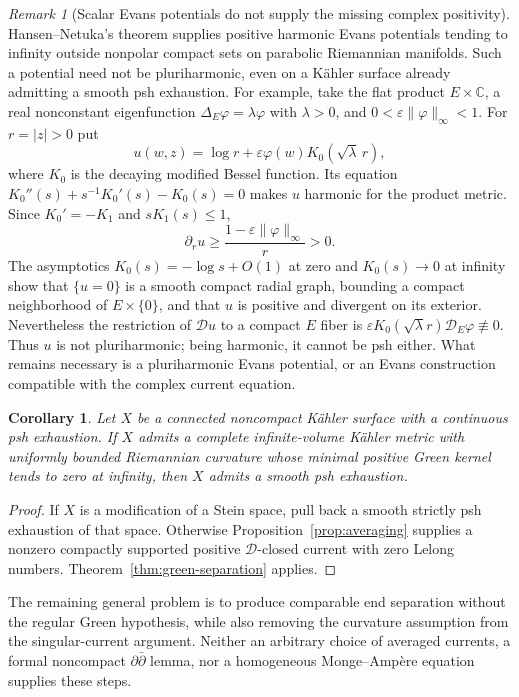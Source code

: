 \documentclass[11pt]{article}
\newtheorem{corollary}[theorem]{Corollary}
\theoremstyle{remark}
\newtheorem{remark}[theorem]{Remark}
\newcommand{\D}{\mathcal D}
\begin{document}
\begin{remark}[Scalar Evans potentials do not supply the missing complex positivity]
Hansen--Netuka's theorem \cite{HN} supplies positive harmonic Evans
potentials tending to infinity outside nonpolar compact sets on
parabolic Riemannian manifolds. Such a potential need not be
pluriharmonic, even on a K\"ahler surface already admitting a smooth
psh exhaustion. For example, take the flat product $E\times\mathbb C$,
a real nonconstant eigenfunction $\Delta_E\varphi=\lambda\varphi$
with $\lambda>0$, and $0<\varepsilon\|\varphi\|_\infty<1$.
For $r=|z|>0$ put
\[
 u(w,z)=\log r+\varepsilon\varphi(w)K_0(\sqrt\lambda\,r),
\]
where $K_0$ is the decaying modified Bessel function. Its equation
$K_0''(s)+s^{-1}K_0'(s)-K_0(s)=0$ makes $u$ harmonic for the product
metric. Since $K_0'=-K_1$ and $sK_1(s)\le1$,
\[
 \partial_r u\ge \frac{1-\varepsilon\|\varphi\|_\infty}{r}>0.
\]
The asymptotics $K_0(s)=-\log s+O(1)$ at zero and $K_0(s)\to0$ at
infinity show that $\{u=0\}$ is a smooth compact radial graph, bounding
a compact neighborhood of $E\times\{0\}$, and that $u$ is positive and
divergent on its exterior. Nevertheless the restriction of $\D u$
to a compact $E$ fiber is
$\varepsilon K_0(\sqrt\lambda r)\D_E\varphi\not\equiv0$.
Thus $u$ is not pluriharmonic; being harmonic, it cannot be psh either.
What remains necessary is a pluriharmonic Evans potential, or an Evans
construction compatible with the complex current equation.
\end{remark}



\begin{corollary}\label{cor:regular-green-smoothing}
Let $X$ be a connected noncompact K\"ahler surface with a continuous psh
exhaustion. If $X$ admits a complete infinite-volume K\"ahler metric
with uniformly bounded Riemannian curvature whose minimal positive
Green kernel tends to zero at infinity, then $X$ admits a smooth psh
exhaustion.
\end{corollary}
\begin{proof}
If $X$ is a modification of a Stein space, pull back a smooth strictly
psh exhaustion of that space. Otherwise Proposition~\ref{prop:averaging}
supplies a nonzero compactly supported positive $\D$-closed current
with zero Lelong numbers. Theorem~\ref{thm:green-separation} applies.
\end{proof}

The remaining general problem is to produce comparable end separation
without the regular Green hypothesis, while also removing the curvature
assumption from the singular-current argument. Neither an arbitrary
choice of averaged currents, a formal noncompact $\partial\bar\partial$
lemma, nor a homogeneous Monge--Amp\`ere equation supplies these steps.
\end{document}
